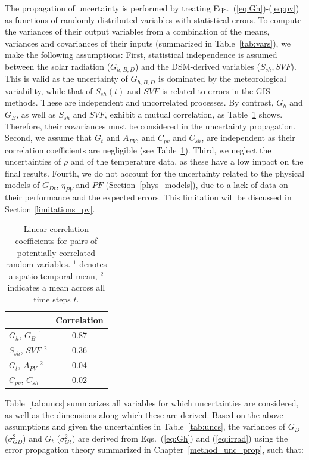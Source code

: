 The propagation of uncertainty is performed by treating Eqs.~(\ref{eq:Gh})-(\ref{eq:pv}) as functions of randomly distributed variables with statistical errors. 
To compute the variances of their output variables from a combination of the means, variances and covariances of their inputs (summarized in Table~\ref{tab:vars}), we make the following assumptions:
First, statistical independence is assumed between the solar radiation ($G_{h, B, D}$) and the DSM-derived variables ($S_{sh}, SVF$). 
This is valid as the uncertainty of $G_{h, B, D}$ is dominated by the meteorological variability, while that of $S_{sh}(t)$ and $SVF$ is related to errors in the GIS methods. These are independent and uncorrelated processes. 
By contrast, $G_h$ and $G_B$, as well as $S_{sh}$ and $SVF$, exhibit a mutual correlation, as Table~\ref{tab:covrr} shows. Therefore, their covariances must be considered in the uncertainty propagation. 
Second, we assume that $G_t$ and $A_{PV}$, and $C_{pv}$ and $C_{sh}$, are independent as their correlation coefficients are negligible (see Table~\ref{tab:covrr}).
Third, we neglect the uncertainties of $\rho$ and of the temperature data, as these have a low impact on the final results.
Fourth, we do not account for the uncertainty related to the physical models of $G_{Dt}$, $\eta_{PV}$ and $PF$ (Section~\ref{phys_models}), due to a lack of data on their performance and the expected errors. This limitation will be discussed in Section \ref{limitations_pv}.

\begin{table}[tb]
\centering
\footnotesize
    \begin{tabular}{lc}
    \hline
                        & \textbf{Correlation}  \\ \hline
    $G_h$, $G_B$ $^1$    & 0.87                  \\
    $S_{sh}$, $SVF$ $^2$  & 0.36                  \\ 
    $G_t$, $A_{PV}$ $^2$  & 0.04                  \\
    $C_{pv}$, $C_{sh}$    & 0.02                  \\   \hline \end{tabular}
\caption{Linear correlation coefficients for pairs of potentially correlated random variables. $^1$ denotes a spatio-temporal mean, $^2$ indicates a mean across all time steps $t$.}
\label{tab:covrr}
\end{table}

Table~\ref{tab:uncs} summarizes all variables for which uncertainties are considered, as well as the dimensions along which these are derived.
Based on the above assumptions and given the uncertainties in Table~\ref{tab:uncs}, the variances of $G_D$ ($\sigma^2_{GD}$) and $G_t$ ($\sigma^2_{Gt}$) are derived from Eqs.~(\ref{eq:Gh}) and (\ref{eq:irrad}) using the error propagation theory summarized in Chapter~\ref{method_unc_prop}, such that:

